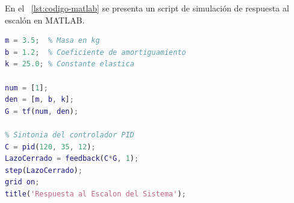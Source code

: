En el \lstlistingname~\ref{lst:codigo-matlab} se presenta un script de simulación de respuesta al escalón en MATLAB.

\begin{lstlisting}[language=Matlab, caption={Simulación y sintonización de parámetros en MATLAB.}, label={lst:codigo-matlab}]
% Definicion de la planta mecatronica
m = 3.5;  % Masa en kg
b = 1.2;  % Coeficiente de amortiguamiento
k = 25.0; % Constante elastica

num = [1];
den = [m, b, k];
G = tf(num, den);

% Sintonia del controlador PID
C = pid(120, 35, 12);
LazoCerrado = feedback(C*G, 1);
step(LazoCerrado);
grid on;
title('Respuesta al Escalon del Sistema');
\end{lstlisting}
